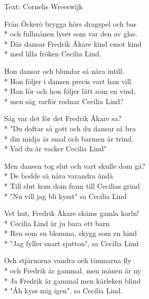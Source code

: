 \begin{SongText}
    \begin{SongInfo}
        Text: Cornelis Wreeswijk
    \end{SongInfo}
    \begin{SongVerse}
        Från Öckerö brygga hörs dragspel och bas\\*%
        och fullmånen lyser som var den av glas.\\*%
        Där dansar Fredrik Åkare kind emot kind\\*%
        med lilla fröken Cecilia Lind.
    \end{SongVerse}
    \begin{SongVerse}
        Hon dansar och blundar så nära intill.\\*%
        Hon följer i dansen precis vart han vill.\\*%
        Han för och hon följer lätt som en vind,\\*%
        men säg varför rodnar Cecilia Lind?
    \end{SongVerse}
    \begin{SongVerse}
        Säg var det för det Fredrik Åkare sa?\\*%
        "Du doftar så gott och du dansar så bra\\*%
        din midja är smal och barmen är trind.\\*%
        Vad du är vacker Cecilia Lind"
    \end{SongVerse}
    \begin{SongVerse}
        Men dansen tog slut och vart skulle dom gå?\\*%
        De bodde så nära varandra ändå\\*%
        Till slut kom dom fram till Cecilias grind\\*%
        "Nu vill jag bli kysst" sa Cecilia Lind
    \end{SongVerse}
    \begin{SongVerse}
        Vet hut, Fredrik Åkare skäms gamla karln!\\*%
        Cecilia Lind är ju bara ett barn\\*%
        Ren som en blomma, skygg som en hind\\*%
        "Jag fyller snart sjutton", sa Cecilia Lind
    \end{SongVerse}
    \begin{SongVerse}
        Och stjärnorna vandra och timmarna fly\\*%
        och Fredrik är gammal, men månen är ny\\*%
        Ja Fredrik är gammal men kärleken blind\\*%
        "Åh kyss mig igen", sa Cecilia Lind.
    \end{SongVerse}
    \end{SongText}